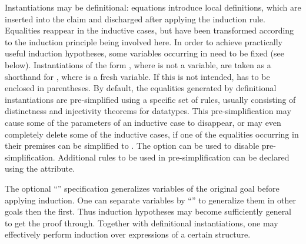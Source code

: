 \begin{isabellebody}
\begin{isamarkuptext}
\begin{description}
  Instantiations may be definitional: equations 
  introduce local definitions, which are inserted into the claim and
  discharged after applying the induction rule.  Equalities reappear
  in the inductive cases, but have been transformed according to the
  induction principle being involved here.  In order to achieve
  practically useful induction hypotheses, some variables occurring in
   need to be fixed (see below).  Instantiations of the form
  , where  is not a variable, are taken as a
  shorthand for \mbox{}, where  is a fresh
  variable. If this is not intended,  has to be enclosed in
  parentheses.  By default, the equalities generated by definitional
  instantiations are pre-simplified using a specific set of rules,
  usually consisting of distinctness and injectivity theorems for
  datatypes. This pre-simplification may cause some of the parameters
  of an inductive case to disappear, or may even completely delete
  some of the inductive cases, if one of the equalities occurring in
  their premises can be simplified to .  The  option can be used to disable pre-simplification.
  Additional rules to be used in pre-simplification can be declared
  using the \hypertarget{attribute.induct-simp}{\hyperlink{attribute.induct-simp}{\mbox{}}} attribute.

  The optional ``''
  specification generalizes variables  of the original goal before applying induction.  One can
  separate variables by ``'' to generalize them in other
  goals then the first. Thus induction hypotheses may become
  sufficiently general to get the proof through.  Together with
  definitional instantiations, one may effectively perform induction
  over expressions of a certain structure.
  

\end{description}
\end{isamarkuptext}
\end{isabellebody}
